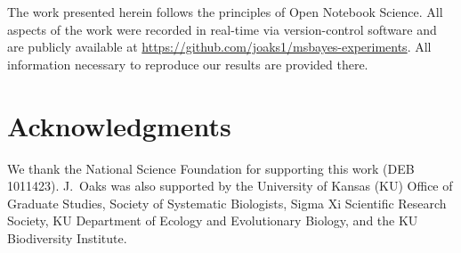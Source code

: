 \documentclass[letterpaper,12pt]{article}
\begin{document}
\begin{linenumbers}
The work presented herein follows the principles of Open Notebook Science.
All aspects of the work were recorded in real-time via version-control
software and are publicly available at
\href{https://github.com/joaks1/msbayes-experiments}{https://github.com/joaks1/msbayes-experiments}.
All information necessary to reproduce our results are provided there.




\section*{Acknowledgments}
We thank the National Science Foundation for supporting this work (DEB
1011423).
J.\ Oaks was also supported by the University of Kansas (KU) Office of Graduate
Studies, Society of Systematic Biologists, Sigma Xi Scientific Research
Society, KU Department of Ecology and Evolutionary Biology, and the KU
Biodiversity Institute.


% 

\newpage
\singlespacing

\renewcommand\listfigurename{Figure Captions}
\renewcommand\cftdotsep{\cftnodots}
\setlength\cftbeforefigskip{10pt}
\listoffigures


\end{linenumbers}

\newpage
\singlespacing
\end{document}
